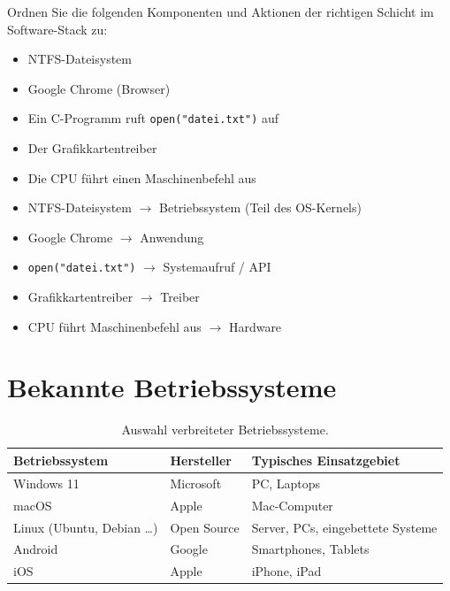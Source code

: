 \begin{myexercise}
    Ordnen Sie die folgenden Komponenten und Aktionen der richtigen Schicht im Software-Stack zu:
    \begin{itemize}
        \item NTFS-Dateisystem
        \item Google Chrome (Browser)
        \item Ein C-Programm ruft \texttt{open("datei.txt")} auf
        \item Der Grafikkartentreiber
        \item Die CPU führt einen Maschinenbefehl aus
    \end{itemize}
    \begin{myanswer}
        \begin{itemize}
            \item NTFS-Dateisystem $\to$ Betriebssystem (Teil des OS-Kernels)
            \item Google Chrome $\to$ Anwendung
            \item \texttt{open("datei.txt")} $\to$ Systemaufruf / API
            \item Grafikkartentreiber $\to$ Treiber
            \item CPU führt Maschinenbefehl aus $\to$ Hardware
        \end{itemize}
    \end{myanswer}
\end{myexercise}

\section{Bekannte Betriebssysteme}

\begin{table}[H]
    \centering
    \begin{tabular}{l|l|l}
        \textbf{Betriebssystem} & \textbf{Hersteller} & \textbf{Typisches Einsatzgebiet} \\\midrule\midrule
        Windows 11              & Microsoft           & PC, Laptops \\\midrule
        macOS                   & Apple               & Mac-Computer \\\midrule
        Linux (Ubuntu, Debian \ldots) & Open Source  & Server, PCs, eingebettete Systeme \\\midrule
        Android                 & Google              & Smartphones, Tablets \\\midrule
        iOS                     & Apple               & iPhone, iPad \\
    \end{tabular}
    \caption{Auswahl verbreiteter Betriebssysteme.}
    \label{tab:betriebssysteme}
\end{table}

